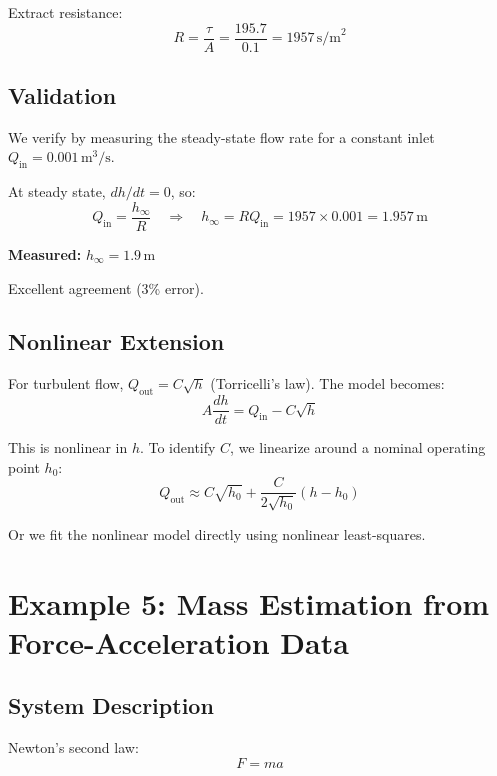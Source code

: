 Extract resistance:
\begin{equation}
R = \frac{\tau}{A} = \frac{195.7}{0.1} = 1957 \, \text{s/m}^2
\end{equation}

\subsection{Validation}

We verify by measuring the steady-state flow rate for a constant inlet $Q_{\text{in}} = 0.001 \, \text{m}^3\text{/s}$.

At steady state, $dh/dt = 0$, so:
\begin{equation}
Q_{\text{in}} = \frac{h_{\infty}}{R} \quad \Rightarrow \quad h_{\infty} = RQ_{\text{in}} = 1957 \times 0.001 = 1.957 \, \text{m}
\end{equation}

\textbf{Measured:} $h_{\infty} = 1.9 \, \text{m}$

Excellent agreement (3\% error).

\subsection{Nonlinear Extension}

For turbulent flow, $Q_{\text{out}} = C\sqrt{h}$ (Torricelli's law). The model becomes:
\begin{equation}
A\frac{dh}{dt} = Q_{\text{in}} - C\sqrt{h}
\end{equation}

This is nonlinear in $h$. To identify $C$, we linearize around a nominal operating point $h_0$:
\begin{equation}
Q_{\text{out}} \approx C\sqrt{h_0} + \frac{C}{2\sqrt{h_0}}(h - h_0)
\end{equation}

Or we fit the nonlinear model directly using nonlinear least-squares.

\section{Example 5: Mass Estimation from Force-Acceleration Data}

\subsection{System Description}

Newton's second law:
\begin{equation}
F = ma
\end{equation}

